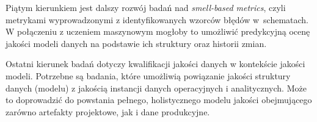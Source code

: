 Piątym kierunkiem jest dalszy rozwój badań nad \emph{smell-based metrics}, czyli metrykami wyprowadzonymi z identyfikowanych wzorców błędów w~schematach. W połączeniu z uczeniem maszynowym mogłoby to umożliwić predykcyjną ocenę jakości modeli danych na podstawie ich struktury oraz historii zmian.

Ostatni kierunek badań dotyczy kwalifikacji jakości danych w kontekście jakości modeli. Potrzebne są badania, które umożliwią powiązanie jakości struktury danych (modelu) z jakością instancji danych operacyjnych i analitycznych. Może to doprowadzić do powstania pełnego, holistycznego modelu jakości obejmującego zarówno artefakty projektowe, jak i dane produkcyjne.



